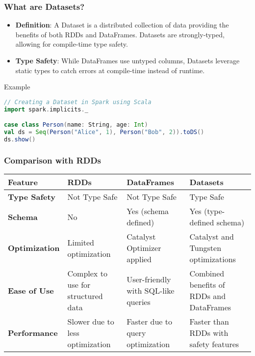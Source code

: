 \documentclass[aspectratio=169]{beamer}
\begin{document}
\begin{frame}[fragile]
    \frametitle{What are Datasets?}
    \begin{itemize}
        \item \textbf{Definition}: A Dataset is a distributed collection of data providing the benefits of both RDDs and DataFrames. Datasets are strongly-typed, allowing for compile-time type safety.
        \item \textbf{Type Safety}: While DataFrames use untyped columns, Datasets leverage static types to catch errors at compile-time instead of runtime.
    \end{itemize}
    \begin{block}{Example}
        \begin{lstlisting}[language=scala]
// Creating a Dataset in Spark using Scala
import spark.implicits._

case class Person(name: String, age: Int)
val ds = Seq(Person("Alice", 1), Person("Bob", 2)).toDS()
ds.show()
        \end{lstlisting}
    \end{block}
\end{frame}

\begin{frame}
    \frametitle{Comparison with RDDs}
    \begin{center}
        \begin{tabular}{|l|l|l|l|}
            \hline
            \textbf{Feature} & RDDs & DataFrames & Datasets \\
            \hline
            \textbf{Type Safety} & Not Type Safe & Not Type Safe & Type Safe \\
            \hline
            \textbf{Schema} & No & Yes (schema defined) & Yes (type-defined schema) \\
            \hline
            \textbf{Optimization} & Limited optimization & Catalyst Optimizer applied & Catalyst and Tungsten optimizations \\
            \hline
            \textbf{Ease of Use} & Complex to use for structured data & User-friendly with SQL-like queries & Combined benefits of RDDs and DataFrames \\
            \hline
            \textbf{Performance} & Slower due to less optimization & Faster due to query optimization & Faster than RDDs with safety features \\
            \hline
        \end{tabular}
    \end{center}
\end{frame}
\end{document}

